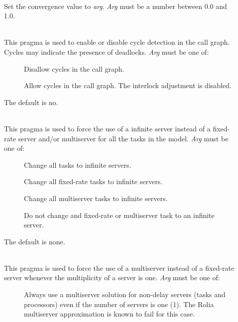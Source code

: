 \begin{description}
\item[]~\\
Set the convergence value to \emph{arg}.  
\emph{Arg} must be a number between 0.0 and 1.0.
\item[]~\\
This pragma is used to enable or disable cycle detection in the call
graph.  Cycles may indicate the presence of deadlocks.
\emph{Arg} must be one of: 
\begin{description}
\item[]
Disallow cycles in the call graph.
\item[]
Allow cycles in the call graph.  The interlock adjustment is disabled.
\end{description}
The default is no.
\item[]~\\
This pragma is used to force the use of a infinite
server instead of a fixed-rate server and/or multiserver for all the tasks in the model.
\emph{Arg} must be one of: 
\begin{description}
\item[]
Change all tasks to infinite servers.
\item[]
Change all fixed-rate tasks to infinite servers.
\item[]
Change all multiserver tasks to infinite servers.
\item[]
Do not change and fixed-rate or multiserver task to an infinite server.
\end{description}
The default is none.
\item[]~\\
This pragma is used to force the use of a multiserver
instead of a fixed-rate server whenever the multiplicity of a server is one.
\emph{Arg} must be one of: 
\begin{description}
\item[]
Always use a multiserver solution for non-delay servers (tasks and processors) even if the number of servers is one (1).
The Rolia multiserver approximation is known to fail for this case.
\item[]

\end{description}
\end{description}
